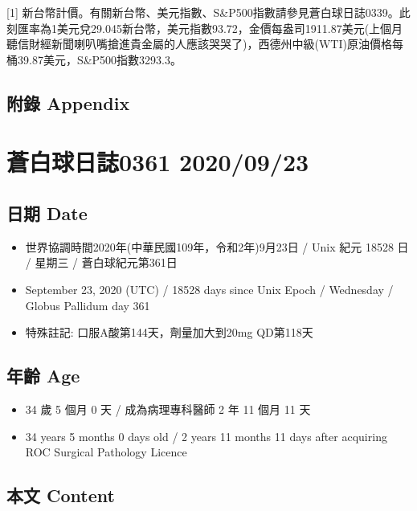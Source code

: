 \documentclass[a5paper, 11pt
]{book}
\providecommand{\tightlist}{%
  \setlength{\itemsep}{0pt}\setlength{\parskip}{0pt}}
\begin{document}
{[}1{]}
新台幣計價。有關新台幣、美元指數、S\&P500指數請參見蒼白球日誌0339。此刻匯率為1美元兌29.045新台幣，美元指數93.72，金價每盎司1911.87美元(上個月聽信財經新聞喇叭嘴搶進貴金屬的人應該哭哭了)，西德州中級(WTI)原油價格每桶39.87美元，S\&P500指數3293.3。

\hypertarget{ux9644ux9304-appendix-21}{%
\subsection{附錄 Appendix}\label{ux9644ux9304-appendix-21}}

\hypertarget{ux84bcux767dux7403ux65e5ux8a8c0361-20200923}{%
\section{蒼白球日誌0361
2020/09/23}\label{ux84bcux767dux7403ux65e5ux8a8c0361-20200923}}

\hypertarget{ux65e5ux671f-date-22}{%
\subsection{日期 Date}\label{ux65e5ux671f-date-22}}

\begin{itemize}
\tightlist
\item
  世界協調時間2020年(中華民國109年，令和2年)9月23日 / Unix 紀元 18528 日
  / 星期三 / 蒼白球紀元第361日
\item
  September 23, 2020 (UTC) / 18528 days since Unix Epoch / Wednesday /
  Globus Pallidum day 361
\item
  特殊註記: 口服A酸第144天，劑量加大到20mg QD第118天
\end{itemize}

\hypertarget{ux5e74ux9f61-age-22}{%
\subsection{年齡 Age}\label{ux5e74ux9f61-age-22}}

\begin{itemize}
\tightlist
\item
  34 歲 5 個月 0 天 / 成為病理專科醫師 2 年 11 個月 11 天
\item
  34 years 5 months 0 days old / 2 years 11 months 11 days after
  acquiring ROC Surgical Pathology Licence
\end{itemize}

\hypertarget{ux672cux6587-content-22}{%
\subsection{本文 Content}\label{ux672cux6587-content-22}}
\end{document}
